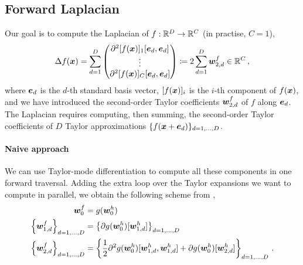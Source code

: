 \subsection{Forward Laplacian}
Our goal is to compute the Laplacian of $f: {\mathbb{R}}^D \to {\mathbb{R}}^C$ (in practise, $C=1$),
\begin{align}
  \Delta f({\bm{x}})
  =
  \sum_{d=1}^D
  \begin{pmatrix}
    \partial^2[f({\bm{x}})]_1[{\bm{e}}_d, {\bm{e}}_d]
    \\
    \vdots
    \\
    \partial^2[f({\bm{x}})]_C[{\bm{e}}_d, {\bm{e}}_d]
  \end{pmatrix}
  \coloneq
  2 \sum_{d=1}^D {\bm{w}}_{2,d}^f \in {\mathbb{R}}^C\,,
\end{align}
where ${\bm{e}}_d$ is the $d$-th standard basis vector, $[f({\bm{x}})]_i$ is the $i$-th component of $f({\bm{x}})$, and we have introduced the second-order Taylor coefficients ${\bm{w}}_{2,d}^f$ of $f$ along ${\bm{e}}_d$.
The Laplacian requires computing, then summing, the second-order Taylor coefficients of $D$ Taylor approximations $\{f({\bm{x}} + {\bm{e}}_d)\}_{d=1,\dots, D}$.

\paragraph{Naive approach} We can use Taylor-mode differentiation to compute all these components in one forward traversal. Adding the extra loop over the Taylor expansions we want to compute in parallel, we obtain the following scheme from ,
\begin{subequations}\label{eq:taylor-mode-naive-laplacian}
  \begin{align}
    {\bm{w}}_0^f
    &=
      g({\bm{w}}_0^h)
    \\
    \left\{
    {\bm{w}}_{1,d}^f
    \right\}_{d=1, \dots, D}
    &=
      \left\{
      \partial g({\bm{w}}_0^h)[{\bm{w}}_{1,d}^h]
      \right\}_{d=1, \dots, D}
    \\ \label{eq:naive-laplacian-second-order-term}
    \left\{
    {\bm{w}}_{2,d}^f
    \right\}_{d=1, \dots, D}
    &=
      \left\{
      \frac{1}{2}
      \partial^2 g({\bm{w}}_0^h)[{\bm{w}}_{1,d}^h, {\bm{w}}_{1,d}^h]
      +
      \partial g({\bm{w}}_0^h)[{\bm{w}}_{2,d}^h]
      \right\}_{d=1, \dots, D}\,.
  \end{align}
\end{subequations}

